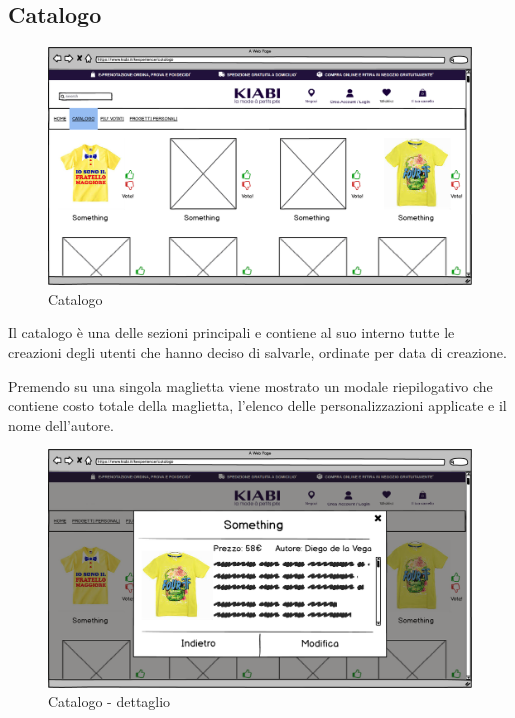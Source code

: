 \documentclass[12pt,italian,]{report}
\begin{document}
\hypertarget{catalogo}{%
\subsection{Catalogo}\label{catalogo}}

\begin{figure}[h]
\centering
\includegraphics{../balsamiq/balsamiq_finale/Catalogo.png}
\caption{Catalogo}
\end{figure}

Il catalogo è una delle sezioni principali e contiene al suo interno tutte le creazioni degli utenti che hanno deciso di salvarle, ordinate per data di creazione.

Premendo su una singola maglietta viene mostrato un modale riepilogativo
che contiene costo totale della maglietta, l'elenco delle
personalizzazioni applicate e il nome dell'autore.

\begin{figure}[h]
\centering
\includegraphics{../balsamiq/balsamiq_finale/Catalogodetails.png}
\caption{Catalogo - dettaglio}
\end{figure}
\end{document}
